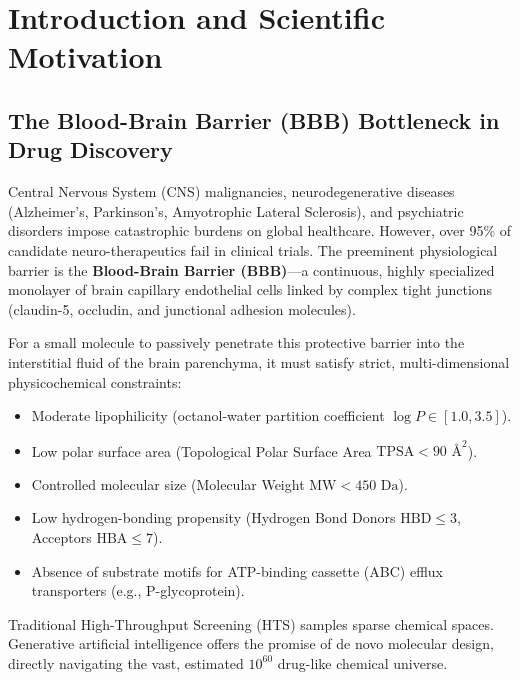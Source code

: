 \documentclass[11pt, a4paper]{article}
\begin{document}
\section{Introduction and Scientific Motivation}

\subsection{The Blood-Brain Barrier (BBB) Bottleneck in Drug Discovery}
Central Nervous System (CNS) malignancies, neurodegenerative diseases (Alzheimer's, Parkinson's, Amyotrophic Lateral Sclerosis), and psychiatric disorders impose catastrophic burdens on global healthcare. However, over 95\% of candidate neuro-therapeutics fail in clinical trials. The preeminent physiological barrier is the \textbf{Blood-Brain Barrier (BBB)}---a continuous, highly specialized monolayer of brain capillary endothelial cells linked by complex tight junctions (claudin-5, occludin, and junctional adhesion molecules). 

For a small molecule to passively penetrate this protective barrier into the interstitial fluid of the brain parenchyma, it must satisfy strict, multi-dimensional physicochemical constraints:
\begin{itemize}[noitemsep]
    \item Moderate lipophilicity (octanol-water partition coefficient $\log P \in [1.0, 3.5]$).
    \item Low polar surface area (Topological Polar Surface Area $\text{TPSA} < 90\text{ \AA}^2$).
    \item Controlled molecular size (Molecular Weight $\text{MW} < 450\text{ Da}$).
    \item Low hydrogen-bonding propensity (Hydrogen Bond Donors $\text{HBD} \le 3$, Acceptors $\text{HBA} \le 7$).
    \item Absence of substrate motifs for ATP-binding cassette (ABC) efflux transporters (e.g., P-glycoprotein).
\end{itemize}

Traditional High-Throughput Screening (HTS) samples sparse chemical spaces. Generative artificial intelligence offers the promise of de novo molecular design, directly navigating the vast, estimated $10^{60}$ drug-like chemical universe.
\end{document}
